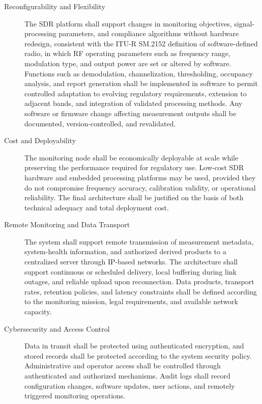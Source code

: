\documentclass[11pt]{article}
\begin{document}
\begin{description}

\item[Reconfigurability and Flexibility] The SDR platform shall support changes in monitoring objectives, signal-processing parameters, and compliance algorithms without hardware redesign, consistent with the ITU-R SM.2152 definition of software-defined radio, in which RF operating parameters such as frequency range, modulation type, and output power are set or altered by software. Functions such as demodulation, channelization, thresholding, occupancy analysis, and report generation shall be implemented in software to permit controlled adaptation to evolving regulatory requirements, extension to adjacent bands, and integration of validated processing methods. Any software or firmware change affecting measurement outputs shall be documented, version-controlled, and revalidated.

\item[Cost and Deployability] The monitoring node shall be economically deployable at scale while preserving the performance required for regulatory use. Low-cost SDR hardware and embedded processing platforms may be used, provided they do not compromise frequency accuracy, calibration validity, or operational reliability. The final architecture shall be justified on the basis of both technical adequacy and total deployment cost.

\item[Remote Monitoring and Data Transport] The system shall support remote transmission of measurement metadata, system-health information, and authorized derived products to a centralized server through IP-based networks. The architecture shall support continuous or scheduled delivery, local buffering during link outages, and reliable upload upon reconnection. Data products, transport rates, retention policies, and latency constraints shall be defined according to the monitoring mission, legal requirements, and available network capacity.

\item[Cybersecurity and Access Control] Data in transit shall be protected using authenticated encryption, and stored records shall be protected according to the system security policy. Administrative and operator access shall be controlled through authenticated and authorized mechanisms. Audit logs shall record configuration changes, software updates, user actions, and remotely triggered monitoring operations.


\end{description}
\end{document}
